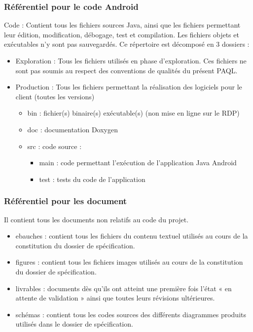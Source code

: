 \documentclass[a4paper,11pt,titlepage]{article}
\newcounter{subsubsubsection}[subsubsection]
\begin{document}
\subsubsection{Référentiel pour le code Android}
Code : Contient tous les fichiers sources Java, ainsi que les fichiers permettant leur
édition, modification, débogage, test et compilation. Les fichiers objets et exécutables
n'y sont pas sauvegardés. Ce répertoire est décomposé en 3 dossiers :
\begin{itemize}
    \item Exploration : Tous les fichiers utilisés en phase d'exploration.
          Ces fichiers ne sont pas soumis au respect des
          conventions de qualités du présent PAQL.
    \item Production : Tous les fichiers permettant la réalisation
          des logiciels pour le client (toutes les versions)
          \begin{itemize}
              \item bin : fichier(s) binaire(s) exécutable(s) (non mise en ligne sur le RDP)
              \item doc : documentation Doxygen
              \item src : code source :
                    \begin{itemize}
                        \item main : code permettant l'exécution de l'application Java Android
                        \item test : tests du code de l'application
                    \end{itemize}
          \end{itemize}
\end{itemize}

\subsubsection{Référentiel pour les document}
Il contient tous les documents non relatifs au code du projet.
\begin{itemize}
    \item ebauches : contient tous les fichiers du contenu textuel utilisés au
          cours de la constitution du dossier de spécification.
    \item figures : contient tous les fichiers images utilisés au
          cours de la constitution du dossier de spécification.
    \item livrables : documents dès qu'ils ont atteint
          une première fois l'état « en attente de validation » ainsi que
          toutes leurs révisions ultérieures.
    \item schémas : contient tous les codes sources des différents diagrammes 
          produits utilisés dans le dossier de spécification.
\end{itemize}
\end{document}
